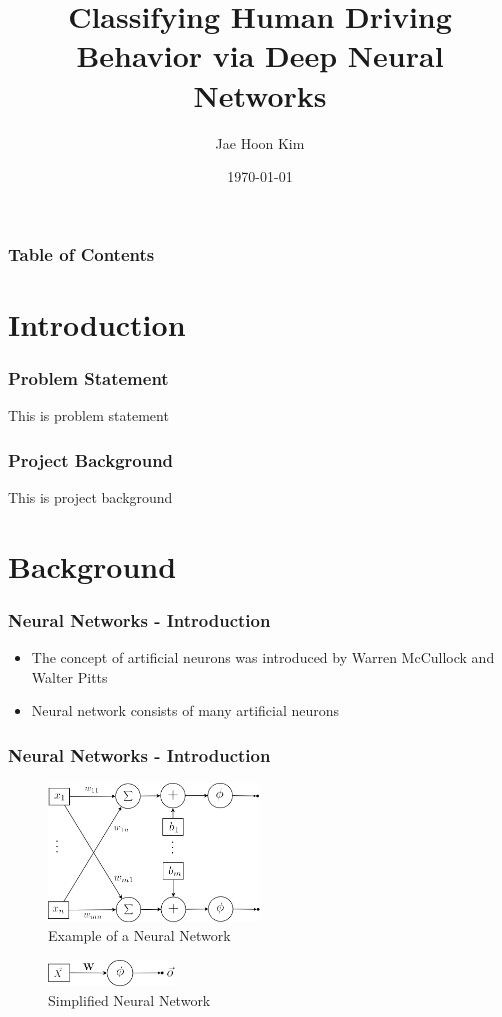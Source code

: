 \documentclass{beamer}
\title{Classifying Human Driving Behavior via Deep Neural Networks}
\author{Jae Hoon Kim}
\institute{Drexel University}
\date{\today}
\begin{document}
\frame{\titlepage}


\begin{frame}
\frametitle{Table of Contents}
\tableofcontents
\end{frame}

\section{Introduction}
\begin{frame}
\frametitle{Problem Statement}
This is problem statement
\end{frame}

\begin{frame}
\frametitle{Project Background}
This is project background
\end{frame}

\section{Background}
\begin{frame}
\frametitle{Neural Networks - Introduction}
\begin{itemize}
\item The concept of artificial neurons was introduced by Warren McCullock and Walter Pitts
\item Neural network consists of many artificial neurons
\end{itemize}
\end{frame}

\begin{frame}
\frametitle{Neural Networks - Introduction}
\begin{figure}[t!]
    \centering
    \includegraphics[width=0.5\textwidth]{../paper/pictures/figures/detail_NN.png}
    \caption{Example of a Neural Network}
    \label{fig:detail_NN}
\end{figure}

\begin{figure}[t!]
    \centering
    \includegraphics[width=0.3\textwidth]{../paper/pictures/figures/NN.png}
    \caption{Simplified Neural Network}
    \label{fig:NN}
\end{figure}
\end{frame}
\end{document}
